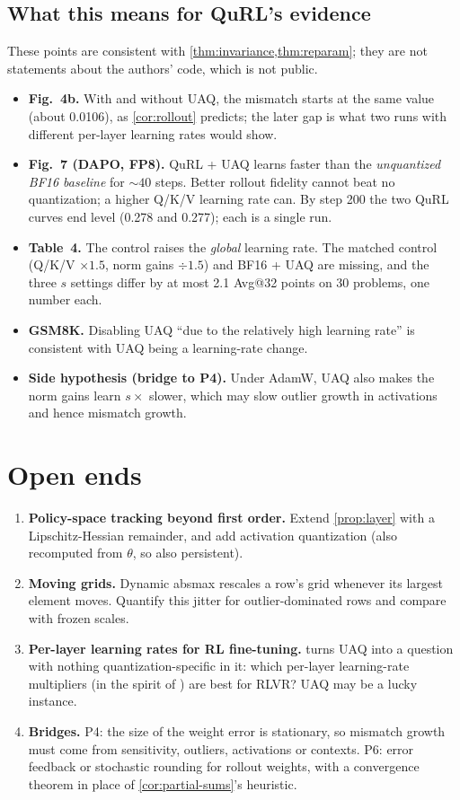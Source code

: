 \documentclass[11pt]{article}
\begin{document}
\subsection{What this means for QuRL's evidence}\label{sec:evidence}
These points are consistent with \cref{thm:invariance,thm:reparam}; they are not statements about the authors' code, which is not public.
\begin{itemize}
\item \textbf{Fig.~4b.} With and without UAQ, the mismatch starts at the same value (about 0.0106), as \cref{cor:rollout} predicts; the later gap is what two runs with different per-layer learning rates would show.
\item \textbf{Fig.~7 (DAPO, FP8).} QuRL + UAQ learns faster than the \emph{unquantized BF16 baseline} for ${\sim}40$ steps. Better rollout fidelity cannot beat no quantization; a higher Q/K/V learning rate can. By step 200 the two QuRL curves end level (0.278 and 0.277); each is a single run.
\item \textbf{Table~4.} The control raises the \emph{global} learning rate. The matched control (Q/K/V $\times1.5$, norm gains $\div1.5$) and BF16 + UAQ are missing, and the three $s$ settings differ by at most 2.1 Avg@32 points on 30 problems, one number each.
\item \textbf{GSM8K.} Disabling UAQ ``due to the relatively high learning rate'' is consistent with UAQ being a learning-rate change.
\item \textbf{Side hypothesis (bridge to P4).} Under AdamW, UAQ also makes the norm gains learn $s\times$ slower, which may slow outlier growth in activations and hence mismatch growth.
\end{itemize}

\section{Open ends}\label{sec:open}
\begin{enumerate}
\item \textbf{Policy-space tracking beyond first order.} Extend \cref{prop:layer} with a Lipschitz-Hessian remainder, and add activation quantization (also recomputed from $\theta$, so also persistent).
\item \textbf{Moving grids.} Dynamic absmax rescales a row's grid whenever its largest element moves. Quantify this jitter for outlier-dominated rows and compare with frozen scales.
\item \textbf{Per-layer learning rates for RL fine-tuning.}  turns UAQ into a question with nothing quantization-specific in it: which per-layer learning-rate multipliers (in the spirit of \citealp{yang2022tp5}) are best for RLVR? UAQ may be a lucky instance.
\item \textbf{Bridges.} P4: the size of the weight error is stationary, so mismatch growth must come from sensitivity, outliers, activations or contexts. P6: error feedback or stochastic rounding for rollout weights, with a convergence theorem in place of \cref{cor:partial-sums}'s heuristic.
\end{enumerate}

\nocite{courbariaux2015binaryconnect,li2017training}



\end{document}
